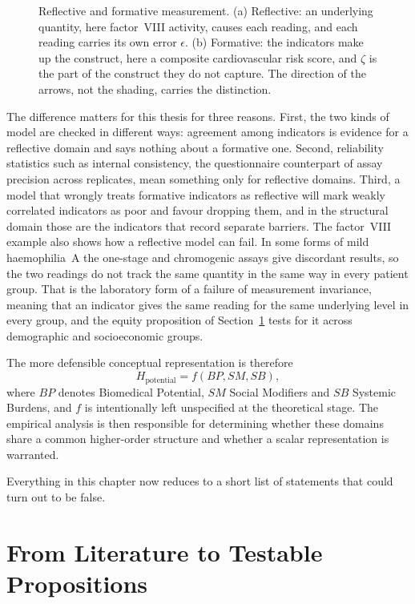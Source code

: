 \begin{figure}[htbp]
\centering

\caption{Reflective and formative measurement. (a) Reflective: an underlying quantity, here factor~VIII activity, causes each reading, and each reading carries its own error $\epsilon$. (b) Formative: the indicators make up the construct, here a composite cardiovascular risk score, and $\zeta$ is the part of the construct they do not capture. The direction of the arrows, not the shading, carries the distinction.}
\label{fig:lit-reflective}
\end{figure}

The difference matters for this thesis for three reasons. First, the two kinds of model are checked in different ways: agreement among indicators is evidence for a reflective domain and says nothing about a formative one. Second, reliability statistics such as internal consistency, the questionnaire counterpart of assay precision across replicates, mean something only for reflective domains. Third, a model that wrongly treats formative indicators as reflective will mark weakly correlated indicators as poor and favour dropping them, and in the structural domain those are the indicators that record separate barriers. The factor~VIII example also shows how a reflective model can fail. In some forms of mild haemophilia~A the one-stage and chromogenic assays give discordant results, so the two readings do not track the same quantity in the same way in every patient group. That is the laboratory form of a failure of measurement invariance, meaning that an indicator gives the same reading for the same underlying level in every group, and the equity proposition of Section~\ref{sec:lit-propositions} tests for it across demographic and socioeconomic groups.

The more defensible conceptual representation is therefore
\begin{equation}
H_{\text{potential}}=f(BP,SM,SB),
\end{equation}
where $BP$ denotes Biomedical Potential, $SM$ Social Modifiers and $SB$ Systemic Burdens, and $f$ is intentionally left unspecified at the theoretical stage. The empirical analysis is then responsible for determining whether these domains share a common higher-order structure and whether a scalar representation is warranted.

Everything in this chapter now reduces to a short list of statements that could
turn out to be false.

\section{From Literature to Testable Propositions}
\label{sec:lit-propositions}

